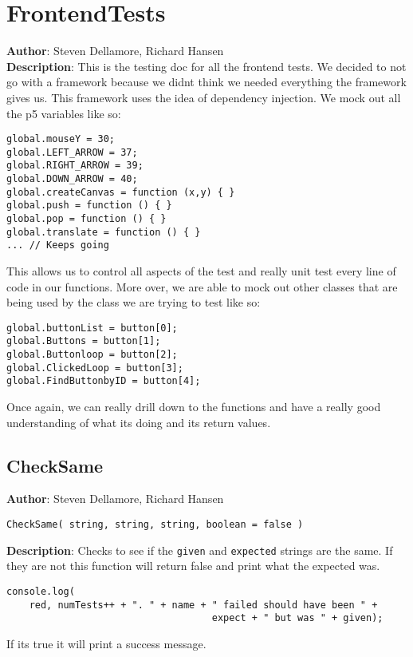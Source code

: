 \documentclass[12pt]{article}
\begin{document}
\section{FrontendTests}
\textbf{Author}: Steven Dellamore, Richard Hansen \\
\textbf{Description}: This is the testing doc for all the frontend tests. We decided to not go with a framework because we didnt think we needed everything the framework gives us. This framework uses the idea of dependency injection. We mock out all the p5 variables like so: 
\begin{verbatim}
global.mouseY = 30;
global.LEFT_ARROW = 37;
global.RIGHT_ARROW = 39;
global.DOWN_ARROW = 40;
global.createCanvas = function (x,y) { }
global.push = function () { }
global.pop = function () { }
global.translate = function () { }
... // Keeps going
\end{verbatim}
 This allows us to control all aspects of the test and really unit test every line of code in our functions. More over, we are able to mock out other classes that are being used by the class we are trying to test like so: 
\begin{verbatim}
global.buttonList = button[0];
global.Buttons = button[1];
global.Buttonloop = button[2];
global.ClickedLoop = button[3];
global.FindButtonbyID = button[4];
\end{verbatim}
 Once again, we can really drill down to the functions and have a really good understanding of what its doing and its return values. \\



\subsection{CheckSame}
\textbf{Author}: Steven Dellamore, Richard Hansen 
\vspace*{1\baselineskip}
\begin{lstlisting}
CheckSame( string, string, string, boolean = false )
\end{lstlisting} 
\vspace*{1\baselineskip}
\textbf{Description}: Checks to see if the \texttt{given} and \texttt{expected} strings are the same. If they are not this function will return false and print what the expected was. 
\begin{verbatim}
console.log(
    red, numTests++ + ". " + name + " failed should have been " + 
                                    expect + " but was " + given);
\end{verbatim}
 If its true it will print a success message. 
\end{document}
